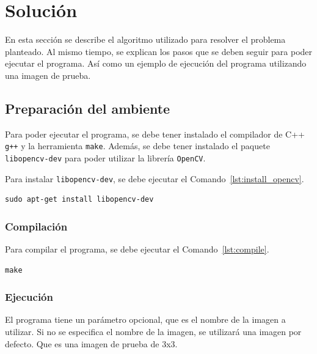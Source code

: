 \section{Solución}\label{sec:solution}

En esta sección se describe el algoritmo utilizado para resolver el problema planteado.
Al mismo tiempo, se explican los pasos que se deben seguir para poder ejecutar el programa.
Así como un ejemplo de ejecución del programa utilizando una imagen de prueba.


\subsection{Preparación del ambiente}\label{subsec:environment-preparation}

Para poder ejecutar el programa, se debe tener instalado el compilador de C++ \texttt{g++} y la herramienta \texttt{make}.
Además, se debe tener instalado el paquete \texttt{libopencv-dev} para poder utilizar la librería \texttt{OpenCV}.

Para instalar \texttt{libopencv-dev}, se debe ejecutar el Comando~\ref{lst:install_opencv}.
\begin{lstlisting}[float=H,caption={Install OpenCV},label={lst:install_opencv}]
sudo apt-get install libopencv-dev
\end{lstlisting}


\subsubsection{Compilación}\label{subsubsec:compilation}

Para compilar el programa, se debe ejecutar el Comando~\ref{lst:compile}.
\begin{lstlisting}[float=H,caption={Compilation},label={lst:compile}]
make
\end{lstlisting}


\subsubsection{Ejecución}\label{subsubsec:execution}

El programa tiene un parámetro opcional, que es el nombre de la imagen a utilizar.
Si no se especifica el nombre de la imagen, se utilizará una imagen por defecto.
Que es una imagen de prueba de 3x3.

